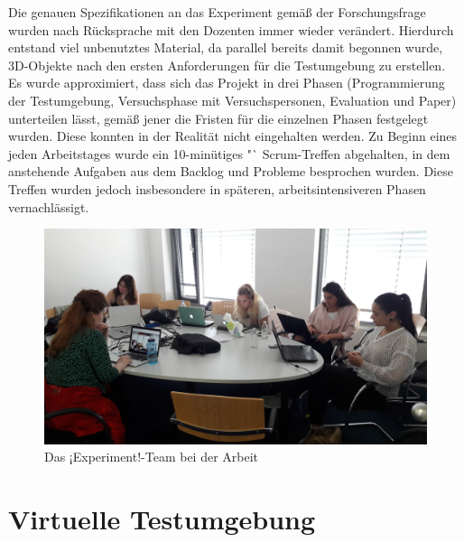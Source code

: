 \documentclass{Bericht}
\begin{document}
		Die genauen Spezifikationen an das Experiment gemäß der Forschungsfrage wurden nach Rücksprache mit den Dozenten immer wieder verändert. Hierdurch entstand viel unbenutztes Material, da parallel bereits damit begonnen wurde, 3D-Objekte nach den ersten Anforderungen für die Testumgebung zu erstellen.\\
		Es wurde approximiert, dass sich das Projekt in drei Phasen (Programmierung der Testumgebung, Versuchsphase mit Versuchspersonen, Evaluation und Paper) unterteilen lässt, gemäß jener die Fristen für die einzelnen Phasen festgelegt wurden. Diese konnten in der Realität nicht eingehalten werden. Zu Beginn eines jeden Arbeitstages wurde ein 10-minütiges "`
		Scrum-Treffen abgehalten, in dem anstehende Aufgaben aus dem Backlog und Probleme besprochen wurden. Diese Treffen wurden jedoch insbesondere in späteren, arbeitsintensiveren Phasen vernachlässigt.\\
		
		\begin{figure}[H] %
			\centering
			\includegraphics[width=\linewidth, height=\textheight, keepaspectratio]{../Bilder/20170518_103125.jpg}
			\caption{Das ¡Experiment!-Team bei der Arbeit}
			\label{img:experiment-team-bei-der-arbeit}
		\end{figure}


\section{Virtuelle Testumgebung}
\end{document}

